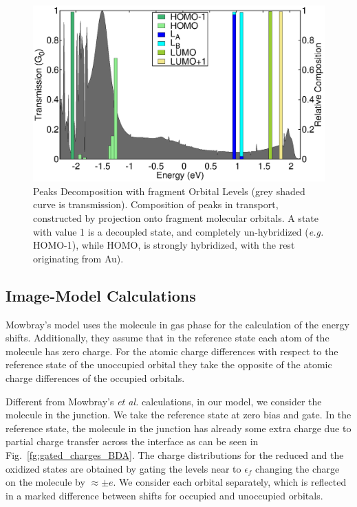 \documentclass[aip,jcp,a4paper,reprint,floatfix,superscriptaddress]{revtex4-1}
\newcommand{\etal}{\emph{et al.}\xspace}
\newcommand{\eg}{\emph{e.g.}\xspace}
\begin{document}
\begin{figure}
   \includegraphics[width=\columnwidth]{img/BDA/BDA-decomposition}
\caption{Peaks Decomposition with fragment Orbital Levels (grey shaded curve is transmission). Composition of peaks in transport, constructed by projection onto fragment molecular orbitals. A state with value 1 is a decoupled state, and completely un-hybridized (\eg HOMO-1), while HOMO, is strongly hybridized, with the rest originating from Au).}\label{fg:BDA-peak-composition}
\end{figure}



\subsection{Image-Model Calculations}\label{imagemodelcalcsBDA}

Mowbray's model uses the molecule in gas phase for the calculation of the energy shifts. Additionally, they assume that in the reference state each atom of the molecule has zero charge. For the atomic charge differences with respect to the reference state of the unoccupied orbital they take the opposite of the atomic charge differences of the occupied orbitals.

Different from Mowbray's \etal calculations, in our model, we consider the molecule in the junction. We take the reference state at zero bias and gate. In the reference state, the molecule in the junction has already some extra charge due to partial charge transfer across the interface \cite{Thygesen2009} as can be seen in Fig.~\ref{fg:gated_charges_BDA}. The charge distributions for the reduced and the oxidized states are obtained by gating the levels near to $\epsilon_f$ changing the charge on the molecule by $\approx \pm e$. We consider each orbital separately, which is reflected in a marked difference between shifts for occupied and unoccupied orbitals.
\end{document}
